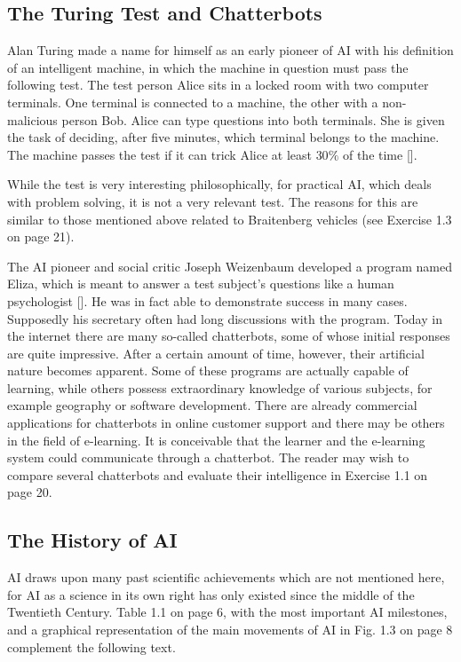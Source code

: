 \documentclass[10pt]{book}
\begin{document}
\subsection{The Turing Test and Chatterbots}
Alan Turing made a name for himself as an early pioneer of AI with his definition of an intelligent machine, in which the machine in question must pass the following test. The test person Alice sits in a locked room with two computer terminals. One terminal is connected to a machine, the other with a non-malicious person Bob. Alice can type questions into both terminals. She is given the task of deciding, after five minutes, which terminal belongs to the machine. The machine passes the test if it can trick Alice at least $30 \%$ of the time [\cite{turing1950computing}].

While the test is very interesting philosophically, for practical AI, which deals with problem solving, it is not a very relevant test. The reasons for this are similar to those mentioned above related to Braitenberg vehicles (see Exercise 1.3 on page 21).

The AI pioneer and social critic Joseph Weizenbaum developed a program named Eliza, which is meant to answer a test subject's questions like a human psychologist [\cite{weizenbaum1966eliza}]. He was in fact able to demonstrate success in many cases. Supposedly his secretary often had long discussions with the program. Today in the internet there are many so-called chatterbots, some of whose initial responses are quite impressive. After a certain amount of time, however, their artificial nature becomes apparent. Some of these programs are actually capable of learning, while others possess extraordinary knowledge of various subjects, for example geography or software development. There are already commercial applications for chatterbots in online customer support and there may be others in the field of e-learning. It is conceivable that the learner and the e-learning system could communicate through a chatterbot. The reader may wish to compare several chatterbots and evaluate their intelligence in Exercise 1.1 on page 20.

\subsection{The History of AI}
AI draws upon many past scientific achievements which are not mentioned here, for AI as a science in its own right has only existed since the middle of the Twentieth Century. Table 1.1 on page 6, with the most important AI milestones, and a graphical representation of the main movements of AI in Fig. 1.3 on page 8 complement the following text.
\end{document}
